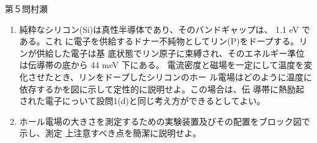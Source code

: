 \begin{question}{第５問}{村瀬}
\begin{enumerate}
\begin{figure}[b]
\begin{center}
  \end{center}
  \caption{}
  \end{figure}
\item
  純粋なシリコン(Si)は真性半導体であり、そのバンドギャップは、 1.1 eV である。これ
  に電子を供給するドナー不純物としてリン(P)をドープする。リンが供給した電子は基
  底状態でリン原子に束縛され、そのエネルギー準位は伝導帯の底から 44 meV 下にある。
  電流密度と磁場を一定にして温度を変化させたとき、リンをドープしたシリコンのホー
  ル電場はどのように温度に依存するかを図に示して定性的に説明せよ。この場合は、伝
  導帯に熱励起された電子にっいて設問1(d)と同じ考え方ができるとしてよい。
\item
  ホール電場の大きさを測定するための実験装置及びその配置をブロック図で示し、測定
  上注意すべき点を簡潔に説明せよ。
\end{enumerate}
\end{question}
